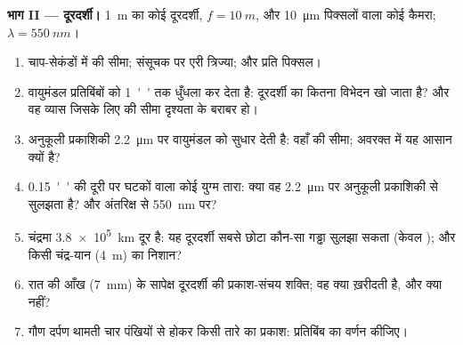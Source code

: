 \begin{problem}
\medskip
\noindent\textbf{भाग II --- दूरदर्शी।}
\qty{1}{m} का कोई दूरदर्शी, $f = \qty{10}{m}$, और \qty{10}{\micro m} पिक्सलों वाला
कोई कैमरा; $\lambda = \qty{550}{nm}$।
\begin{enumerate}[resume]
  \item चाप-सेकंडों में  की सीमा; संसूचक पर एरी
        त्रिज्या; और प्रति  पिक्सल।
  \item वायुमंडल प्रतिबिंबों को \qty{1}{''} तक धुँधला कर देता है: दूरदर्शी का
        कितना विभेदन खो जाता है? और वह व्यास जिसके लिए
         की सीमा दृश्यता के बराबर हो।
  \item अनुकूली प्रकाशिकी \qty{2.2}{\micro m} पर वायुमंडल को सुधार देती है:
        वहाँ  की सीमा; अवरक्त में यह आसान क्यों है?
  \item \qty{0.15}{''} की दूरी पर घटकों वाला कोई युग्म तारा: क्या वह
        \qty{2.2}{\micro m} पर अनुकूली प्रकाशिकी से सुलझता है? और अंतरिक्ष से \qty{550}{nm} पर?
  \item चंद्रमा \qty{3.8e5}{km} दूर है: यह दूरदर्शी सबसे छोटा कौन-सा गड्ढा
        सुलझा सकता (केवल ); और किसी चंद्र-यान (\qty{4}{m}) का
        निशान?
  \item रात की आँख (\qty{7}{mm}) के सापेक्ष दूरदर्शी की प्रकाश-संचय
        शक्ति; वह क्या ख़रीदती है, और क्या नहीं?
  \item गौण दर्पण थामती चार पंखियों से होकर किसी तारे का
        प्रकाश: प्रतिबिंब का वर्णन कीजिए।
\end{enumerate}


\end{problem}
